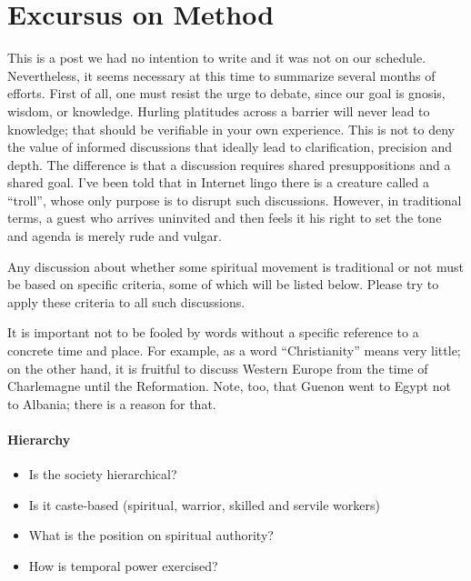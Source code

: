 \section{Excursus on Method}

This is a post we had no intention to write and it was not on our schedule. Nevertheless, it seems necessary at this time to summarize several months of efforts. First of all, one must resist the urge to debate, since our goal is gnosis, wisdom, or knowledge. Hurling platitudes across a barrier will never lead to knowledge; that should be verifiable in your own experience. This is not to deny the value of informed discussions that ideally lead to clarification, precision and depth. The difference is that a discussion requires shared presuppositions and a shared goal. I've been told that in Internet lingo there is a creature called a ``troll'', whose only purpose is to disrupt such discussions. However, in traditional terms, a guest who arrives uninvited and then feels it his right to set the tone and agenda is merely rude and vulgar.

Any discussion about whether some spiritual movement is traditional or not must be based on specific criteria, some of which will be listed below. Please try to apply these criteria to all such discussions.

It is important not to be fooled by words without a specific reference to a concrete time and place. For example, as a word ``Christianity'' means very little; on the other hand, it is fruitful to discuss Western Europe from the time of Charlemagne until the Reformation. Note, too, that Guenon went to Egypt not to Albania; there is a reason for that.

\paragraph{Hierarchy}


\begin{itemize}


\item Is the society hierarchical?

\item Is it caste-based (spiritual, warrior, skilled and servile workers)

\item What is the position on spiritual authority?

\item How is temporal power exercised?
\end{itemize}


